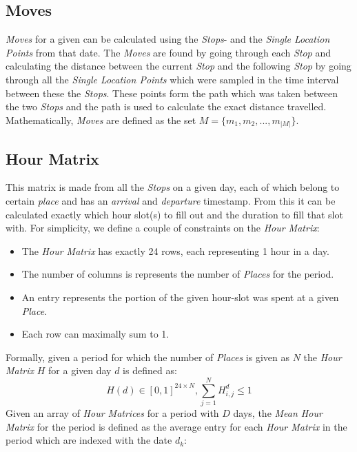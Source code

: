 \subsection{Moves}
\textit{Moves} for a given can be calculated using the \textit{Stops}- and the \textit{Single Location Points} from that date. The \textit{Moves} are found by going through each \textit{Stop} and calculating the distance between the current \textit{Stop} and the following \textit{Stop} by going through all the \textit{Single Location Points} which were sampled in the time interval between these the \textit{Stops}. These points form the path which was taken between the two \textit{Stops} and the path is used to calculate the exact distance travelled.\\

Mathematically, \textit{Moves} are defined as the set $M = \{m_1, m_2, ..., m_{|M|}\}.$\\


\subsection{Hour Matrix}
This matrix is made from all the \textit{Stops} on a given day, each of which belong to certain \textit{place} and has an \textit{arrival} and \textit{departure} timestamp. From this it can be calculated exactly which hour slot(s) to fill out and the duration to fill that slot with. For simplicity, we define a couple of constraints on the \textit{Hour Matrix}:

\begin{itemize}
    \item The \textit{Hour Matrix} has exactly 24 rows, each representing 1 hour in a day.
    \item The number of columns is represents the number of \textit{Places} for the period. 
    \item An entry represents the portion of the given hour-slot was spent at a given \textit{Place}.
    \item Each row can maximally sum to 1.
\end{itemize}

Formally, given a period for which the number of \textit{Places} is given as $N$ the \textit{Hour Matrix} $H$ for a given day $d$ is defined as:
$$H(d) \in [0,1]^{24 \times N}, \sum_{j=1}^N H^d_{i,j} \leq 1$$
Given an array of \textit{Hour Matrices} for a period with $D$ days, the \textit{Mean Hour Matrix} for the period is defined as the average entry for each \textit{Hour Matrix} in the period which are indexed with the date $d_k$:

